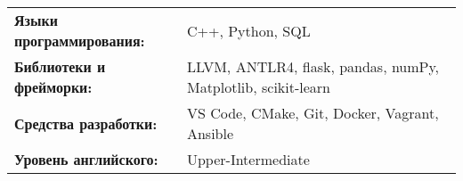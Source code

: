 \begin{tabularx}{\linewidth}{@{}l X@{}}
  \textbf{Языки программирования:} & \normalsize{C++, Python, SQL} \\
  \textbf{Библиотеки и фрейморки:}  &  \normalsize{LLVM, ANTLR4, flask, pandas, numPy, Matplotlib, scikit-learn}\\  
  \textbf{Средства разработки:}  &  \normalsize{VS Code, CMake, Git, Docker, Vagrant, Ansible}\\  
  \textbf{Уровень английского:} & \normalsize{Upper-Intermediate} \\
  \end{tabularx}